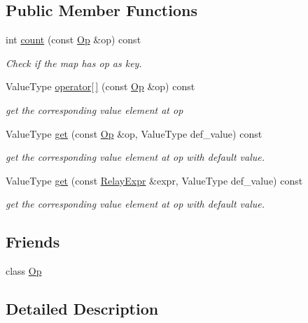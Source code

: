 \subsection*{Public Member Functions}
\begin{DoxyCompactItemize}
\item 
int \hyperlink{classtvm_1_1OpMap_a682c5cbb2d79f69e047d0f04041bd1c1}{count} (const \hyperlink{classtvm_1_1Op}{Op} \&op) const 
\begin{DoxyCompactList}\small\item\em Check if the map has op as key. \end{DoxyCompactList}\item 
Value\+Type \hyperlink{classtvm_1_1OpMap_ab719867303894f6e441a59348cab4ced}{operator\mbox{[}$\,$\mbox{]}} (const \hyperlink{classtvm_1_1Op}{Op} \&op) const 
\begin{DoxyCompactList}\small\item\em get the corresponding value element at op \end{DoxyCompactList}\item 
Value\+Type \hyperlink{classtvm_1_1OpMap_a3704a7d04cd90cf722361b1a7b3eec2c}{get} (const \hyperlink{classtvm_1_1Op}{Op} \&op, Value\+Type def\+\_\+value) const 
\begin{DoxyCompactList}\small\item\em get the corresponding value element at op with default value. \end{DoxyCompactList}\item 
Value\+Type \hyperlink{classtvm_1_1OpMap_ae1069dc1bd6bf1b277960ef4b791c8c3}{get} (const \hyperlink{classtvm_1_1RelayExpr}{Relay\+Expr} \&expr, Value\+Type def\+\_\+value) const 
\begin{DoxyCompactList}\small\item\em get the corresponding value element at op with default value. \end{DoxyCompactList}\end{DoxyCompactItemize}
\subsection*{Friends}
\begin{DoxyCompactItemize}
\item 
class \hyperlink{classtvm_1_1OpMap_a2c31e8a3c11caeb061d69db14ebb0e95}{Op}
\end{DoxyCompactItemize}


\subsection{Detailed Description}
